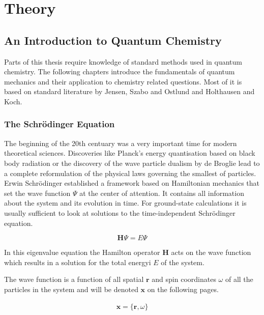 
\chapter{Theory}
\label{sec:theory}


\section{An Introduction to Quantum Chemistry}
\label{sec:IntroductiontoQM}

Parts of this thesis require knowledge of standard methods used in quantum
chemistry. The following chapters introduce the fundamentals of quantum
mechanics and their application to chemistry related questions. Most of it is
based on standard literature by Jensen\autocite{jensen_introduction_2006},
Szabo and Ostlund\autocite{szabo_modern_1996} and Holthausen and
Koch\autocite{koch_chemists_2001}.

\subsection{The Schr\"odinger Equation}

The beginning of the 20th centuary was a very important time for modern
theoretical sciences. Discoveries like Planck's energy quantisation based on
black body radiation or the discovery of the wave particle dualism by de
Broglie lead to a complete reformulation of the physical laws governing the
smallest of particles. Erwin Schr\"odinger established a framework based on
Hamiltonian mechanics that set the wave function $\Psi$ at the center of
attention. It contains all information about the system and its evolution in
time. For ground-state calculations it is usually sufficient to look at
solutions to the time-independent Schr\"odinger equation.

\begin{equation}
	\mathbf{H}\Psi=E\Psi
\end{equation}

In this eigenvalue equation the Hamilton operator $\mathbf{H}$ acts on the wave
function which results in a solution for the total energyi $E$ of the system. 

The wave function is a function of all spatial $\mathbf{r}$ and spin
coordinates $\omega$ of all the particles in the system and will be denoted
$\mathbf{x}$ on the following pages.  

\begin{align}
    \mathbf{x}=\{\mathbf{r},\omega\}
\end{align}


